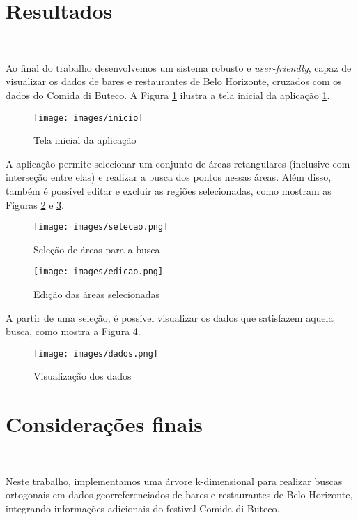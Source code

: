 \documentclass{article}
\begin{document}
\begin{adjustwidth}{-1.5cm}{-1.5cm}
\section{Resultados}
\ 

Ao final do trabalho desenvolvemos um sistema robusto e \textit{user-friendly}, capaz de visualizar os dados de bares e restaurantes de Belo Horizonte, cruzados com os dados do Comida di Buteco. A Figura \ref{fig:inicio} ilustra a tela inicial da aplicação \ref{fig:inicio}.

\begin{figure}[H]
    \centering
    \texttt{[image: images/inicio]}
    \caption{Tela inicial da aplicação}
    \label{fig:inicio}
\end{figure}

A aplicação permite selecionar um conjunto de áreas retangulares (inclusive com interseção entre elas) e realizar a busca dos pontos nessas áreas. Além disso, também é possível editar e excluir as regiões selecionadas, como mostram as Figuras \ref{fig:selecao} e \ref{fig:edicao}.

\begin{figure}[H]
    \centering
    \texttt{[image: images/selecao.png]}
    \caption{Seleção de áreas para a busca}
    \label{fig:selecao}
\end{figure}

\begin{figure}[H]
    \centering
    \texttt{[image: images/edicao.png]}
    \caption{Edição das áreas selecionadas}
    \label{fig:edicao}
\end{figure}

A partir de uma seleção, é possível visualizar os dados que satisfazem aquela busca, como mostra a Figura \ref{fig:dados}.

\begin{figure}[H]
    \centering
    \texttt{[image: images/dados.png]}
    \caption{Visualização dos dados}
    \label{fig:dados}
\end{figure}

\section{Considerações finais}
\ 

Neste trabalho, implementamos uma árvore k-dimensional para realizar buscas ortogonais em dados georreferenciados de bares e restaurantes de Belo Horizonte, integrando informações adicionais do festival Comida di Buteco.


\end{adjustwidth}
\end{document}
